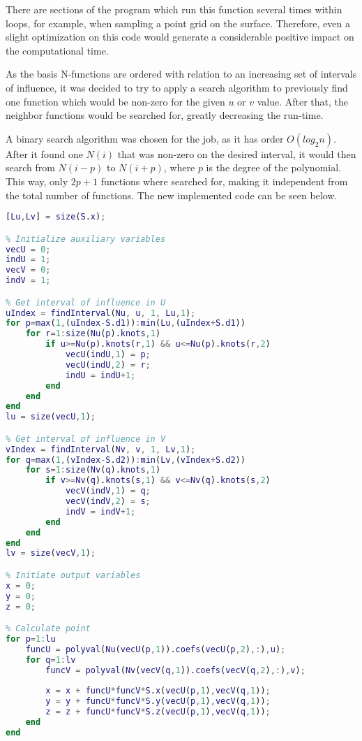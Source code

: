 	There are sections of the program which run this function several times within loops, for example, when sampling a point grid on the surface. Therefore, even a slight optimization on this code would generate a considerable positive impact on the computational time.
	
	As the basis N-functions are ordered with relation to an increasing set of intervals of influence, it was decided to try to apply a search algorithm to previously find one function which would be non-zero for the given $u$ or $v$ value. After that, the neighbor functions would be searched for, greatly decreasing the run-time.
	
	A binary search algorithm was chosen for the job, as it has order $O(log_2 n)$. After it found one $N(i)$ that was non-zero on the desired interval, it would then search from $N(i-p)$ to $N(i+p)$, where $p$ is the degree of the polynomial. This way, only $2p+1$ functions where searched for, making it independent from the total number of functions. The new implemented code can be seen below.
	\newline
	
	\begin{lstlisting}[language=matlab]
% Number of functions for each direction
[Lu,Lv] = size(S.x);

% Initialize auxiliary variables
vecU = 0;
indU = 1;
vecV = 0;
indV = 1;

% Get interval of influence in U
uIndex = findInterval(Nu, u, 1, Lu,1);
for p=max(1,(uIndex-S.d1)):min(Lu,(uIndex+S.d1))
    for r=1:size(Nu(p).knots,1)
        if u>=Nu(p).knots(r,1) && u<=Nu(p).knots(r,2)
            vecU(indU,1) = p;
            vecU(indU,2) = r;
            indU = indU+1;
        end
    end
end
lu = size(vecU,1);

% Get interval of influence in V
vIndex = findInterval(Nv, v, 1, Lv,1);
for q=max(1,(vIndex-S.d2)):min(Lv,(vIndex+S.d2))
    for s=1:size(Nv(q).knots,1)
        if v>=Nv(q).knots(s,1) && v<=Nv(q).knots(s,2)
            vecV(indV,1) = q;
            vecV(indV,2) = s;
            indV = indV+1;
        end
    end
end 
lv = size(vecV,1);

% Initiate output variables
x = 0;
y = 0;
z = 0;

% Calculate point
for p=1:lu
    funcU = polyval(Nu(vecU(p,1)).coefs(vecU(p,2),:),u);
    for q=1:lv
        funcV = polyval(Nv(vecV(q,1)).coefs(vecV(q,2),:),v);
        
        x = x + funcU*funcV*S.x(vecU(p,1),vecV(q,1));
        y = y + funcU*funcV*S.y(vecU(p,1),vecV(q,1));
        z = z + funcU*funcV*S.z(vecU(p,1),vecV(q,1));
    end
end
	\end{lstlisting}
	
